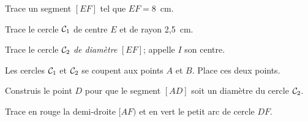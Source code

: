 \begin{myenumerate}
  \item Trace un segment $[EF]$ tel que $EF=8$~cm.
  \item Trace le cercle ${\cal C}_1$ de centre $E$ et de rayon 2,5~cm.
  \item Trace le cercle ${\cal C}_2$ {\em de diamètre} $[EF]$; appelle $I$ son centre.
  \item Les cercles ${\cal C}_1$ et ${\cal C}_2$ se coupent aux points $A$ et $B$. Place ces deux points.
  \item Construis le point $D$ pour que le segment $[AD]$ soit un diamètre du cercle ${\cal C}_2$.
  \item Trace en rouge la demi-droite $[AF)$ et en vert le petit arc de cercle $DF$.
\end{myenumerate}